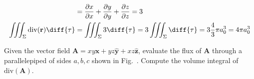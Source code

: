 \begin{solution}
\begin{subequations}
\begin{align}
                        &=\frac{\partial{x}}{\partial{x}}
                         +\frac{\partial{y}}{\partial{y}}
                         +\frac{\partial{z}}{\partial{z}}
                        =3\\
                        \iiint_{\Sigma}
                            \mathrm{div}(\mathbf{r})\diff{\tau}
                        &=\iiint_{\Sigma}3\diff{\tau}
                         =3\iiint_{\Sigma}\diff{\tau}
                         =3\frac{4}{3}\pi{a_{0}^{3}}
                         =4\pi{a_{0}^{3}}
                    \end{align}
                \end{subequations}
            \end{solution} 
            \begin{problem}[Wangsness 1-13]
                \label{problem:EMAG_1_wangsness_1_13}
                Given the vector field
                $\mathbf{A}=xy\hat{\mathbf{x}}%
                           +yz\hat{\mathbf{y}}%
                           +xz\hat{\mathbf{z}}$,
                evaluate the flux of $\mathbf{A}$
                through a parallelepiped of sides $a,b,c$
                shown in Fig.~.
                Compute the volume integral of
                $\mathrm{div}(\mathbf{A})$.
            \end{problem}
